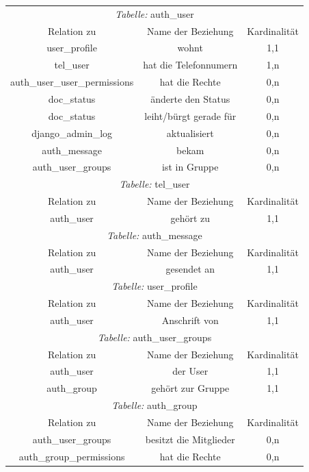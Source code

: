 \begin{longtable}{@{}ccc@{}}
  \toprule
  \multicolumn{3}{c}{\emph{Tabelle:} auth\_user} \\
  Relation zu & Name der Beziehung & Kardinalität \\
  \cmidrule(lr){1-1}\cmidrule(lr){2-2}\cmidrule(lr){3-3}
  user\_profile & wohnt & 1,1\\
  tel\_user & hat die Telefonnumern & 1,n\\
  auth\_user\_user\_permissions & hat die Rechte & 0,n\\
  doc\_status & änderte den Status & 0,n\\  
  doc\_status & leiht/bürgt gerade für & 0,n\\
  django\_admin\_log & aktualisiert & 0,n\\
  auth\_message & bekam & 0,n\\
  auth\_user\_groups & ist in Gruppe & 0,n\\

  \toprule
  \multicolumn{3}{c}{\emph{Tabelle:} tel\_user} \\
  Relation zu & Name der Beziehung & Kardinalität \\
  \cmidrule(lr){1-1}\cmidrule(lr){2-2}\cmidrule(lr){3-3}
  auth\_user & gehört zu & 1,1 \\

  \toprule
  \multicolumn{3}{c}{\emph{Tabelle:} auth\_message} \\
  Relation zu & Name der Beziehung & Kardinalität \\
  \cmidrule(lr){1-1}\cmidrule(lr){2-2}\cmidrule(lr){3-3}
  auth\_user & gesendet an & 1,1 \\

  \toprule
  \multicolumn{3}{c}{\emph{Tabelle:} user\_profile} \\
  Relation zu & Name der Beziehung & Kardinalität \\
  \cmidrule(lr){1-1}\cmidrule(lr){2-2}\cmidrule(lr){3-3}
  auth\_user & Anschrift von & 1,1 \\

  \toprule
  \multicolumn{3}{c}{\emph{Tabelle:} auth\_user\_groups} \\
  Relation zu & Name der Beziehung & Kardinalität \\
  \cmidrule(lr){1-1}\cmidrule(lr){2-2}\cmidrule(lr){3-3}
  auth\_user & der User & 1,1 \\
  auth\_group & gehört zur Gruppe & 1,1 \\

  \toprule
  \multicolumn{3}{c}{\emph{Tabelle:} auth\_group} \\
  Relation zu & Name der Beziehung & Kardinalität \\
  \cmidrule(lr){1-1}\cmidrule(lr){2-2}\cmidrule(lr){3-3}
  auth\_user\_groups & besitzt die Mitglieder & 0,n \\
  auth\_group\_permissions & hat die Rechte & 0,n \\


\end{longtable}
